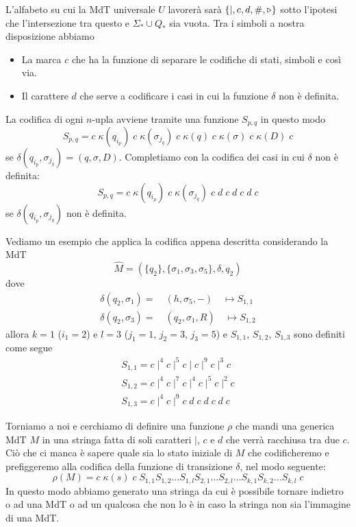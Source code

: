 L'alfabeto su cui la MdT universale $U$ lavorerà sarà
$\{ \mid, c, d, \#, \triangleright \}$ sotto l'ipotesi che l'intersezione
tra questo e $\Sigma_* \cup Q_*$ sia vuota. Tra i simboli a
nostra disposizione abbiamo
\begin{itemize}
	\item La marca $c$ che ha la funzione di separare le
	      codifiche di stati, simboli e così via.
	\item Il carattere $d$ che serve a codificare i casi in cui
	      la funzione $\delta$ non è definita.
\end{itemize}
La codifica di ogni $n$-upla avviene tramite una funzione
$S_{p,q}$ in questo modo
\[
	S_{p,q} = c \; \kappa (q_{i_p})
	\; c \; \kappa (\sigma_{j_q})
	\; c \; \kappa (q)
	\; c \; \kappa (\sigma)
	\; c \; \kappa (D) \; c
\]
se $\delta (q_{i_p}, \sigma_{j_q}) = (q, \sigma, D)$. Completiamo
con la codifica dei casi in cui $\delta$ non è definita:
\[
	S_{p,q} = c \; \kappa (q_{i_p})
	\; c \; \kappa (\sigma_{j_q})
	\; c \; d \; c \; d \; c \; d \; c
\]
se $\delta(q_{i_p}, \sigma_{j_q})$ non è definita.

\begin{example}
	Vediamo un esempio che applica la codifica appena descritta
	considerando la MdT
	\[
		\hat{M} = (\{ q_2 \}, \{ \sigma_1, \sigma_3, \sigma_5 \},
		\delta, q_2)
	\]
	dove
	\begin{gather*}
		\delta(q_2, \sigma_1) = \quad (h, \sigma_5, -)
		\quad \mapsto S_{1,1} \\
		\delta(q_2, \sigma_3) = \quad (q_2, \sigma_1, R)
		\quad \mapsto S_{1,2}
	\end{gather*}
	allora $k=1$ ($i_1=2$) e $l = 3$ ($j_1 = 1$, $j_2 = 3$,
	$j_3 = 5$) e $S_{1,1}$, $S_{1,2}$, $S_{1,3}$ sono definiti
	come segue
	\begin{gather*}
		S_{1,1} = c \mid^4 c \mid^5 c \mid c \mid^9 c \mid^3 c \\
		S_{1,2} = c \mid^4 c \mid^7 c \mid^4 c \mid^5 c \mid^2 c \\
		S_{1,3} = c \mid^4 c \mid^9 c \; d \; c \; d \; c \; d \; c
	\end{gather*}
\end{example}

Torniamo a noi e cerchiamo di definire una funzione $\rho$ che
mandi una generica MdT $M$ in una stringa fatta di soli caratteri
$\mid$, $c$ e $d$ che verrà racchiusa tra due $c$. Ciò che ci
manca è sapere quale sia lo stato iniziale di $M$ che
codificheremo e prefiggeremo alla codifica della funzione di
transizione $\delta$, nel modo seguente:
\[
	\rho (M) = c \; \kappa (s) \; c \;
	S_{1,1} S_{1,2} \dots
	S_{1,l} S_{2,1} \dots S_{2,l} \dots
	S_{k,1} S_{k,2} \dots S_{k,l} \; c
\]
In questo modo abbiamo generato una stringa da cui è possibile
tornare indietro o ad una MdT o ad un qualcosa che non lo è in
caso la stringa non sia l'immagine di una MdT.

